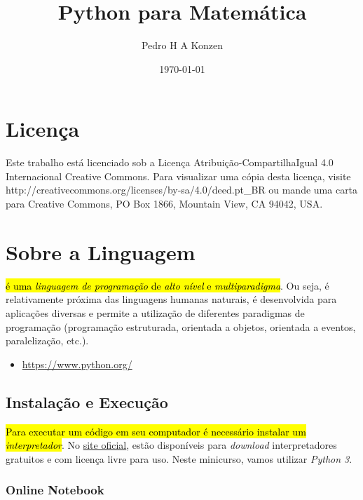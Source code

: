 \documentclass[12pt]{article}
\begin{document}
\title{Python para Matemática}
\author{Pedro H A Konzen}
\date{\today}

\maketitle

\tableofcontents

\section{Licença}\label{sec_licenca}

Este trabalho está licenciado sob a Licença Atribuição-CompartilhaIgual 4.0 Internacional Creative Commons. Para visualizar uma cópia desta licença, visite http://creativecommons.org/licenses/by-sa/4.0/deed.pt\_BR ou mande uma carta para Creative Commons, PO Box 1866, Mountain View, CA 94042, USA.


\section{Sobre a Linguagem}\label{sec_sobrepy}

\hl{{\python} é uma \emph{linguagem de programação} de \emph{alto nível} e \emph{multiparadigma}}. Ou seja, é relativamente próxima das linguagens humanas naturais, é desenvolvida para aplicações diversas e permite a utilização de diferentes paradigmas de programação (programação estruturada, orientada a objetos, orientada a eventos, paralelização, etc.).

\begin{itemize}
\item {}
  \begin{center}
    \href{https://www.python.org/}{https://www.python.org/}
  \end{center}
\end{itemize}

\subsection{Instalação e Execução}

\hl{Para executar um código {\python} em seu computador é necessário instalar um \emph{interpretador}}. No \href{https://www.python.org/}{site oficial}, estão disponíveis para \textit{download} interpretadores gratuitos e com licença livre para uso. Neste minicurso, vamos utilizar \emph{Python 3}.

\subsubsection{Online Notebook}
\end{document}

